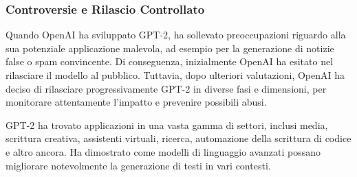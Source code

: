 \subsubsection{Controversie e Rilascio Controllato}
Quando OpenAI ha sviluppato GPT-2, ha sollevato preoccupazioni riguardo alla sua potenziale applicazione malevola, ad esempio per la generazione di notizie false o spam convincente. Di conseguenza, inizialmente OpenAI ha esitato nel rilasciare il modello al pubblico. Tuttavia, dopo ulteriori valutazioni, OpenAI ha deciso di rilasciare progressivamente GPT-2 in diverse fasi e dimensioni, per monitorare attentamente l'impatto e prevenire possibili abusi.


GPT-2 ha trovato applicazioni in una vasta gamma di settori, inclusi media, scrittura creativa, assistenti virtuali, ricerca, automazione della scrittura di codice e altro ancora. Ha dimostrato come modelli di linguaggio avanzati possano migliorare notevolmente la generazione di testi in vari contesti.